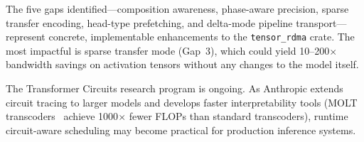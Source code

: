\documentclass[11pt,letterpaper]{article}
\begin{document}
The five gaps identified---composition awareness, phase-aware precision, sparse transfer encoding, head-type prefetching, and delta-mode pipeline transport---represent concrete, implementable enhancements to the \texttt{tensor\_rdma} crate. The most impactful is sparse transfer mode (Gap~3), which could yield 10--200$\times$ bandwidth savings on activation tensors without any changes to the model itself.

The Transformer Circuits research program is ongoing. As Anthropic extends circuit tracing to larger models and develops faster interpretability tools (MOLT transcoders~\cite{anthropic2025molt} achieve 1000$\times$ fewer FLOPs than standard transcoders), runtime circuit-aware scheduling may become practical for production inference systems.



\end{document}
